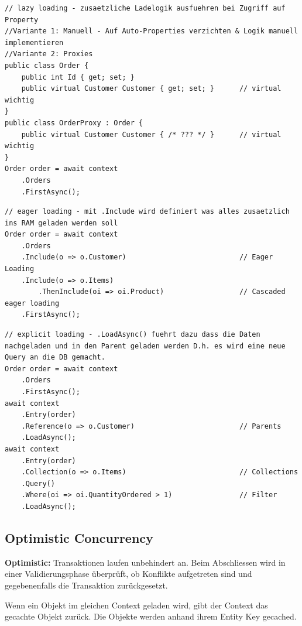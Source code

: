 \documentclass[
a4paper,
oneside,
10pt,
fleqn,
headsepline,
toc=listofnumbered, 
bibliography=totocnumbered]{scrartcl}
\begin{document}
\begin{lstlisting}
// lazy loading - zusaetzliche Ladelogik ausfuehren bei Zugriff auf Property
//Variante 1: Manuell - Auf Auto-Properties verzichten & Logik manuell implementieren
//Variante 2: Proxies 
public class Order {
    public int Id { get; set; }
    public virtual Customer Customer { get; set; }      // virtual wichtig
}
public class OrderProxy : Order {
    public virtual Customer Customer { /* ??? */ }      // virtual wichtig
}
Order order = await context
    .Orders
    .FirstAsync();
\end{lstlisting}

\begin{lstlisting}
// eager loading - mit .Include wird definiert was alles zusaetzlich ins RAM geladen werden soll
Order order = await context
    .Orders
    .Include(o => o.Customer)                           // Eager Loading
    .Include(o => o.Items)
        .ThenInclude(oi => oi.Product)                  // Cascaded eager loading
    .FirstAsync();
\end{lstlisting}

\begin{lstlisting}
// explicit loading - .LoadAsync() fuehrt dazu dass die Daten nachgeladen und in den Parent geladen werden D.h. es wird eine neue Query an die DB gemacht.
Order order = await context
    .Orders
    .FirstAsync();
await context
    .Entry(order)
    .Reference(o => o.Customer)                         // Parents
    .LoadAsync();
await context
    .Entry(order)
    .Collection(o => o.Items)                           // Collections
    .Query()
    .Where(oi => oi.QuantityOrdered > 1)                // Filter
    .LoadAsync();
\end{lstlisting}

\subsection{Optimistic Concurrency}

\textbf{Optimistic:} Transaktionen laufen unbehindert an. Beim Abschliessen wird in einer Validierungsphase überprüft, ob Konflikte aufgetreten sind und gegebenenfalls die Transaktion zurückgesetzt.

Wenn ein Objekt im gleichen Context geladen wird, gibt der Context das gecachte Objekt zurück.
Die Objekte werden anhand ihrem Entity Key gecached.
\end{document}
